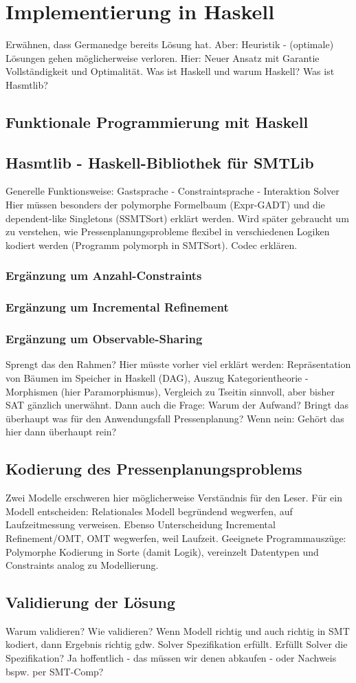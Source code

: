 \section{Implementierung in Haskell}
Erwähnen, dass Germanedge bereits Lösung hat.
Aber: Heuristik - (optimale) Lösungen gehen möglicherweise verloren.
Hier: Neuer Ansatz mit Garantie Vollständigkeit und Optimalität.
Was ist Haskell und warum Haskell?
Was ist Hasmtlib?

\subsection{Funktionale Programmierung mit Haskell}

\subsection{Hasmtlib - Haskell-Bibliothek für SMTLib}
Generelle Funktionsweise: Gastsprache - Constraintsprache - Interaktion Solver
Hier müssen besonders der polymorphe Formelbaum (Expr-GADT) und die dependent-like Singletons (SSMTSort) erklärt werden.
Wird später gebraucht um zu verstehen, wie Pressenplanungsprobleme flexibel in verschiedenen Logiken kodiert werden (Programm polymorph in SMTSort).
Codec erklären.

\subsubsection{Ergänzung um Anzahl-Constraints}

\subsubsection{Ergänzung um Incremental Refinement}

\subsubsection{Ergänzung um Observable-Sharing}
Sprengt das den Rahmen?
Hier müsste vorher viel erklärt werden:
Repräsentation von Bäumen im Speicher in Haskell (DAG),
Auszug Kategorientheorie - Morphismen (hier Paramorphismus),
Vergleich zu Tseitin sinnvoll, aber bisher SAT gänzlich unerwähnt.
Dann auch die Frage: Warum der Aufwand?
Bringt das überhaupt was für den Anwendungsfall Pressenplanung?
Wenn nein: Gehört das hier dann überhaupt rein?

\subsection{Kodierung des Pressenplanungsproblems}
Zwei Modelle erschweren hier möglicherweise Verständnis für den Leser.
Für ein Modell entscheiden: Relationales Modell begründend wegwerfen, auf Laufzeitmessung verweisen.
Ebenso Unterscheidung Incremental Refinement/OMT, OMT wegwerfen, weil Laufzeit.
Geeignete Programmauszüge: Polymorphe Kodierung in Sorte (damit Logik), vereinzelt Datentypen und Constraints analog zu Modellierung.

\subsection{Validierung der Lösung}
Warum validieren?
Wie validieren?
Wenn Modell richtig und auch richtig in SMT kodiert, dann Ergebnis richtig gdw. Solver Spezifikation erfüllt.
Erfüllt Solver die Spezifikation? Ja hoffentlich - das müssen wir denen abkaufen - oder Nachweis bspw. per SMT-Comp?